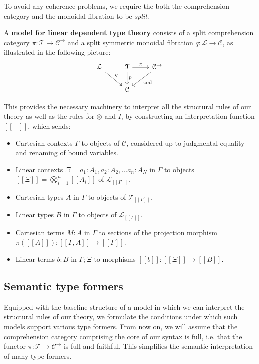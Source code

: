 \documentclass[a4paper,english]{lipics-v2018}
\begin{document}
To avoid any coherence problems, we require the both the comprehension category and the monoidal fibration to be \textit{split}.
\begin{definition}
A \textbf{model for linear dependent type theory} consists of a split comprehension category $\pi : \mathcal{T} \to \mathcal{C}^\to$ and a split symmetric monoidal fibration $q : \mathcal{L} \to \mathcal{C}$, as illustrated in the following picture:
\[
\begin{tikzcd}
\mathcal{L} \ar[rd, "q"] & \mathcal{T} \ar[d, "p"] \ar[r, "\pi"] & \mathcal{C^\rightarrow} \ar[ld, "\text{cod}"]\\
& \mathcal{C}
\end{tikzcd}
\]
\end{definition}

This provides the necessary machinery to interpret all the structural rules of our theory as well as the rules for $\otimes$ and $I$, by constructing an interpretation function $[[-]]$, which sends:
  \begin{itemize}
  \item Cartesian contexts $\Gamma$ to objects of $\mathcal{C}$, considered up to judgmental equality and renaming of bound variables.
  \item Linear contexts $\Xi = a_1 : A_1, a_2 : A_2, \dots a_n : A_N$ in $\Gamma$ to objects $[[\Xi]] = \bigotimes^n_{i = 1}[[A_i]]$ of $\mathcal{L}_{[[\Gamma]]}$.
  \item Cartesian types $A$ in $\Gamma$ to objects of $\mathcal{T}_{[[\Gamma]]}$.
  \item Linear types $B$ in $\Gamma$ to objects of $\mathcal{L}_{[[\Gamma]]}$.
  \item Cartesian terms $M : A$ in $\Gamma$ to sections of the projection morphism $\pi([[A]]) : [[\Gamma,A]] \to [[\Gamma]]$.
  \item Linear terms $b : B$ in $\Gamma; \Xi$ to morphisms $[[b]] : [[\Xi]] \to [[B]]$.
  \end{itemize}
\subsection{Semantic type formers}\label{semtypform}
Equipped with the baseline structure of a model in which we can interpret the structural rules of our theory, we formulate the conditions under which such models support various type formers.
From now on, we will assume that the comprehension category comprising the core of our syntax is full, i.e. that the functor $\pi : \mathcal{T} \to \mathcal{C}^{\to}$ is full and faithful. This simplifies the semantic interpretation of many type formers.
\end{document}
